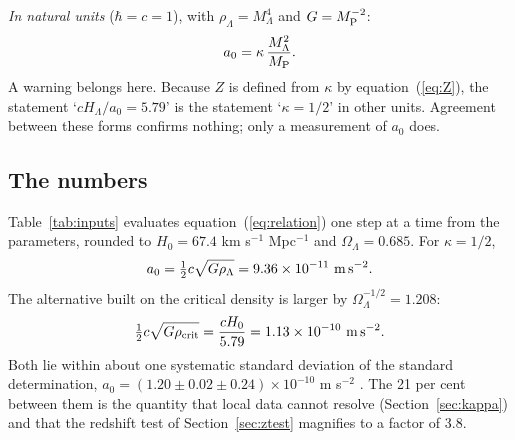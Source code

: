 \documentclass[fleqn,usenatbib]{mnras}
\begin{document}
\emph{In natural units} ($\hbar=c=1$), with $\rho_\Lambda=M_\Lambda^4$ and $G=M_{\rm P}^{-2}$:
\begin{equation}
a_0=\kappa\,\frac{M_\Lambda^2}{M_{\rm P}} .
\end{equation}
A warning belongs here. Because $Z$ is defined from $\kappa$ by equation~(\ref{eq:Z}), the statement `$cH_\Lambda/a_0=5.79$' is the statement `$\kappa=1/2$' in other units. Agreement between these forms confirms nothing; only a measurement of $a_0$ does.

\subsection{The numbers}
\label{sec:numbers}
Table~\ref{tab:inputs} evaluates equation~(\ref{eq:relation}) one step at a time from the \citet{Planck2020} parameters, rounded to $H_0=67.4$ km s$^{-1}$ Mpc$^{-1}$ and $\Omega_\Lambda=0.685$. For $\kappa=1/2$,
\begin{equation}
a_0=\tfrac12c\sqrt{G\rho_\Lambda}=9.36\times10^{-11}\ {\rm m\,s^{-2}} .
\label{eq:a0value}
\end{equation}
The alternative built on the critical density is larger by $\Omega_\Lambda^{-1/2}=1.208$:
\begin{equation}
\tfrac12c\sqrt{G\rho_{\rm crit}}=\frac{cH_0}{5.79}=1.13\times10^{-10}\ {\rm m\,s^{-2}} .
\label{eq:a0crit}
\end{equation}
Both lie within about one systematic standard deviation of the standard determination, $a_0=(1.20\pm0.02\pm0.24)\times10^{-10}$ m s$^{-2}$ \citep{McGaugh2016}. The 21 per cent between them is the quantity that local data cannot resolve (Section~\ref{sec:kappa}) and that the redshift test of Section~\ref{sec:ztest} magnifies to a factor of 3.8.
\end{document}

